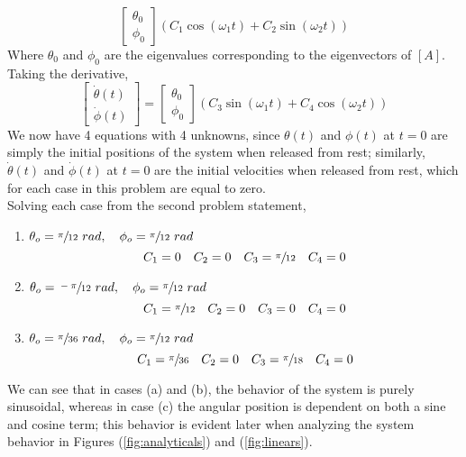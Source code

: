 \documentclass[12pt]{report}
\begin{document}
\begin{flushleft}
$$\begin{bmatrix} \theta_0\\ \phi_0 \end{bmatrix}
\left(C_1\cos(\omega_1 t) + C_2\sin(\omega_2 t)\right)
$$
Where $\theta_0$ and $\phi_0$ are the eigenvalues corresponding to the
eigenvectors of $[A]$.
Taking the derivative,
$$
\begin{bmatrix} \dot{\theta}(t)\\ \dot{\phi}(t) \end{bmatrix} =
\begin{bmatrix} \theta_0\\ \phi_0 \end{bmatrix}
\left(C_3\sin(\omega_1 t) + C_4\cos(\omega_2 t)\right)
$$
We now have 4 equations with 4 unknowns, since $\theta(t)$ and $\phi(t)$ at $t=0$ are simply
the initial positions of the system when released from rest; similarly,
$\dot{\theta}(t)$ and $\dot{\phi}(t)$ at $t=0$ are the initial velocities when released from rest,
which for each case in this problem are equal to zero. \\
Solving each case from the second problem statement,
\begin{enumerate}[label=(\alph*)]
  \item $\theta_o = \sfrac{\pi}{12}~rad, \quad \phi_o = \sfrac{\pi}{12}~rad$
  $$
  C_1 = 0 \quad C_2 = 0 \quad C_3 = \sfrac{\pi}{12} \quad C_4 = 0
  $$
  \item $\theta_o = \sfrac{-\pi}{12}~rad, \quad \phi_o = \sfrac{\pi}{12}~rad$
  $$
  C_1 = \sfrac{\pi}{12} \quad C_2 = 0 \quad C_3 = 0 \quad C_4 = 0
  $$
  \item $\theta_o = \sfrac{\pi}{36}~rad, \quad \phi_o = \sfrac{\pi}{12}~rad$
  $$
  C_1 = \sfrac{\pi}{36} \quad C_2 = 0 \quad C_3 = \sfrac{\pi}{18} \quad C_4 = 0
  $$
\end{enumerate}
We can see that in cases (a) and (b), the behavior of the system is purely sinusoidal,
whereas in case (c) the angular position is dependent on both a sine and cosine term;
this behavior is evident later when analyzing the system behavior in Figures
(\ref{fig:analyticals}) and (\ref{fig:linears}). \\
\newpage

\end{flushleft}
\end{document}
